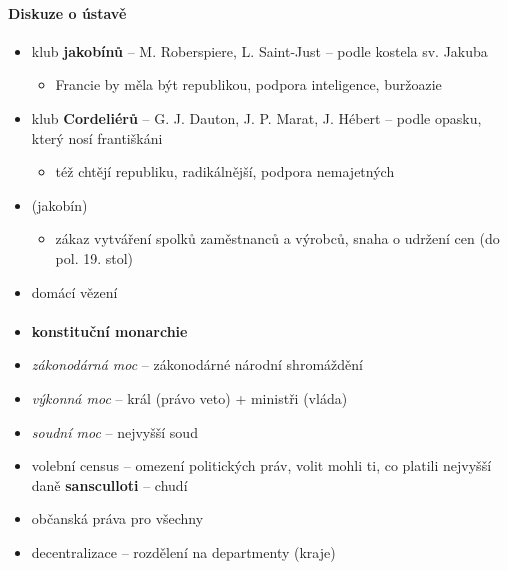 \paragraph{Diskuze o ústavě}
\begin{itemize}
\item klub \textbf{jakobínů} -- M. Roberspiere, L. Saint-Just -- podle kostela sv. Jakuba
	\begin{itemize}
	\item Francie by měla být republikou, podpora inteligence, buržoazie	 
	\end{itemize}			
\item klub \textbf{Cordeliérů} -- G. J. Dauton, J. P. Marat, J. Hébert -- podle opasku, který nosí františkáni
	\begin{itemize}
	\item též chtějí republiku, radikálnější, podpora nemajetných 
	\end{itemize}
\item {} (jakobín)
	\begin{itemize}
	\item zákaz vytváření spolků zaměstnanců a výrobců, snaha o udržení cen (do pol. 19. stol)
	\end{itemize}

\item {} \ra domácí vězení
\end{itemize}

\paragraph{}
\begin{itemize}
\item \textbf{konstituční monarchie}
\item \textit{zákonodárná moc} -- zákonodárné národní shromáždění
\item \textit{výkonná moc} -- král (právo veto) + ministři (vláda)
\item \textit{soudní moc} -- nejvyšší soud
\item volební census -- omezení politických práv, volit mohli ti, co platili nejvyšší daně \ra \textbf{sansculloti} -- chudí
\item občanská práva pro všechny
\item decentralizace -- rozdělení na departmenty (kraje)
\end{itemize}

